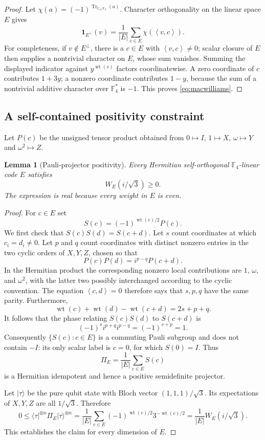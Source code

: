 \documentclass[11pt]{article}
\newtheorem{lemma}[theorem]{Lemma}
\theoremstyle{remark}
\newcommand{\F}{\mathbb F_4}
\newcommand{\wt}{\operatorname{wt}}
\newcommand{\tr}{\operatorname{Tr}}
\newcommand{\ip}[2]{\left\langle #1,#2\right\rangle}
\begin{document}
\begin{proof}
Let $\chi(a)=(-1)^{\tr_{\F/\mathbb F_2}(a)}$.  Character orthogonality
on the linear space $E$ gives
\[
 \boldsymbol1_{E^\perp}(v)=\frac1{|E|}\sum_{c\in E}\chi(\ip{v}{c}).
\]
For completeness, if $v\notin E^\perp$, there is a $c\in E$ with
$\ip{v}{c}\ne0$; scalar closure of $E$ then supplies a nontrivial
character on $E$, whose sum vanishes.  Summing the displayed indicator
against $y^{\wt(v)}$ factors coordinatewise.  A zero coordinate of $c$
contributes $1+3y$; a nonzero coordinate contributes $1-y$, because the
sum of a nontrivial additive character over $\F^*$ is $-1$.
This proves \eqref{eq:macwilliams}.
\end{proof}

\subsection{A self-contained positivity constraint}

Let $P(c)$ be the unsigned tensor product obtained from
$0\mapsto I$, $1\mapsto X$, $\omega\mapsto Y$ and $\omega^2\mapsto Z$.

\begin{lemma}[Pauli-projector positivity]\label{lem:positivity}
Every Hermitian self-orthogonal $\F$-linear code $E$ satisfies
\begin{equation}
 W_E(i/\sqrt3)\geq0.
 \label{eq:positivity}
\end{equation}
The expression is real because every weight in $E$ is even.
\end{lemma}

\begin{proof}
For $c\in E$ set
\[
 S(c)=(-1)^{\wt(c)/2}P(c).
\]
We first check that $S(c)S(d)=S(c+d)$.  Let $s$ count coordinates at
which $c_i=d_i\ne0$.  Let $p$ and $q$ count coordinates with distinct
nonzero entries in the two cyclic orders of $X,Y,Z$, chosen so that
\[
 P(c)P(d)=i^{p-q}P(c+d).
\]
In the Hermitian product the corresponding nonzero local contributions
are $1$, $\omega$, and $\omega^2$, with the latter two possibly
interchanged according to the cyclic convention.  The equation
$\ip{c}{d}=0$ therefore says that $s,p,q$ have the same parity.
Furthermore,
\[
 \wt(c)+\wt(d)-\wt(c+d)=2s+p+q.
\]
It follows that the phase relating $S(c)S(d)$ to $S(c+d)$ is
\[
 (-1)^s i^{p+q}i^{p-q}=(-1)^{s+p}=1.
\]
Consequently $\{S(c):c\in E\}$ is a commuting Pauli subgroup and does
not contain $-I$: its only scalar label is $c=0$, for which $S(0)=I$.
Thus
\[
 \Pi_E=\frac1{|E|}\sum_{c\in E}S(c)
\]
is a Hermitian idempotent and hence a positive semidefinite projector.

Let $\lvert\tau\rangle$ be the pure qubit state with Bloch vector
$(1,1,1)/\sqrt3$.  Its expectations of $X,Y,Z$ are all $1/\sqrt3$.
Therefore
\[
 0\leq
 \langle\tau\rvert^{\otimes n}\Pi_E\lvert\tau\rangle^{\otimes n}
 =\frac1{|E|}\sum_{c\in E}(-1)^{\wt(c)/2}3^{-\wt(c)/2}
 =\frac1{|E|}W_E(i/\sqrt3).
\]
This establishes the claim for every dimension of $E$.
\end{proof}
\end{document}
